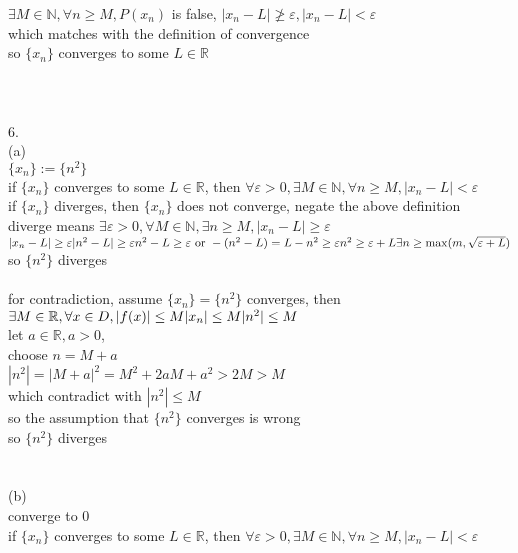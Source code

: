 \documentclass[12pt, border = 4pt, multi]{article} %
\begin{document}
$\exists M \in \mathbb{N}, \forall n \geq M, P(x_n)$ is false, $|x_n - L| \not\geq \varepsilon, |x_n - L| < \varepsilon$\\
which matches with the definition of convergence\\
so $\{x_n\}$ converges to some $L \in \mathbb{R}$\\
\\
\\
\\
6.\\
(a)\\
$\{x_n\} := \{n ^ 2\}$\\
if $\{x_n\}$ converges to some $L \in \mathbb{R}$, then $\forall \varepsilon > 0, \exists M \in \mathbb{N}, \forall n \geq M, |x_n - L| < \varepsilon$\\
if $\{x_n\}$ diverges, then $\{x_n\}$ does not converge, negate the above definition\\
diverge means $\exists \varepsilon > 0, \forall M \in \mathbb{N}, \exists n \geq M, |x_n - L| \geq \varepsilon$\\
$|x_n - L| \geq \varepsilon\\
|n ^ 2 - L| \geq \varepsilon\\
n ^ 2 - L \geq \varepsilon \text{ or } -(n ^ 2 - L) = L - n ^ 2 \geq \varepsilon\\
n ^ 2 \geq \varepsilon + L\\
\exists n \geq \max(m, \sqrt{\varepsilon + L})\\$
so $\{n ^ 2\}$ diverges\\
\\
for contradiction, assume $\{x_n\} = \{n ^ 2\}$ converges, then $\exists M \in \mathbb{R}, \forall x \in D, |f(x)| \leq M\\
|x_n| \leq M\\
|n ^ 2| \leq M$\\
let $a \in \mathbb{R}, a > 0$,\\
choose $n = M + a$\\
$|n ^ 2| = |M + a| ^ 2 = M ^ 2 + 2aM + a ^ 2 > 2M > M$\\
which contradict with $|n ^ 2| \leq M$\\
so the assumption that $\{n ^ 2\}$ converges is wrong\\
so $\{n ^ 2\}$ diverges\\
\\
\\
(b)\\
converge to 0\\
if $\{x_n\}$ converges to some $L \in \mathbb{R}$, then $\forall \varepsilon > 0, \exists M \in \mathbb{N}, \forall n \geq M, |x_n - L| < \varepsilon$\\
\end{document}
